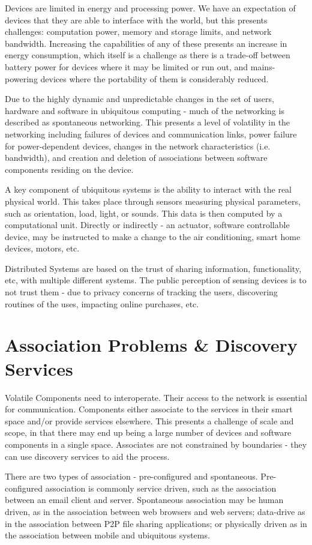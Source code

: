 Devices are limited in energy and processing power. We have an expectation of devices that they are able to interface with the world, but this presents challenges: computation power, memory and storage limits, and network bandwidth. Increasing the capabilities of any of these presents an increase in energy consumption, which itself is a challenge as there is a trade-off between battery power for devices where it may be limited or run out, and mains-powering devices where the portability of them is considerably reduced. 

Due to the highly dynamic and unpredictable changes in the set of users, hardware and software in ubiquitous computing - much of the networking is described as spontaneous networking. This presents a level of volatility in the networking including failures of devices and communication links, power failure for power-dependent devices, changes in the network characteristics (i.e. bandwidth), and creation and deletion of associations between software components residing on the device. 

A key component of ubiquitous systems is the ability to interact with the real physical world. This takes place through sensors measuring physical parameters, such as orientation, load, light, or sounds. This data is then computed by a computational unit. Directly or indirectly - an actuator, software controllable device, may be instructed to make a change to the air conditioning, smart home devices, motors, etc. 

Distributed Systems are based on the trust of sharing information, functionality, etc, with multiple different systems. The public perception of sensing devices is to not trust them - due to privacy concerns of tracking the users, discovering routines of the uses, impacting online purchases, etc. 

\section{Association Problems \& Discovery Services}
Volatile Components need to interoperate. Their access to the network is essential for communication. Components either associate to the services in their smart space and/or provide services elsewhere. This presents a challenge of scale and scope, in that there may end up being a large number of devices and software components in a single space. Associates are not constrained by boundaries - they can use discovery services to aid the process. 

There are two types of association - pre-configured and spontaneous. Pre-configured association is commonly service driven, such as the association between an email client and server. Spontaneous association may be human driven, as in the association between web browsers and web servers; data-drive as in the association between P2P file sharing applications; or physically driven as in the association between mobile and ubiquitous systems. 

